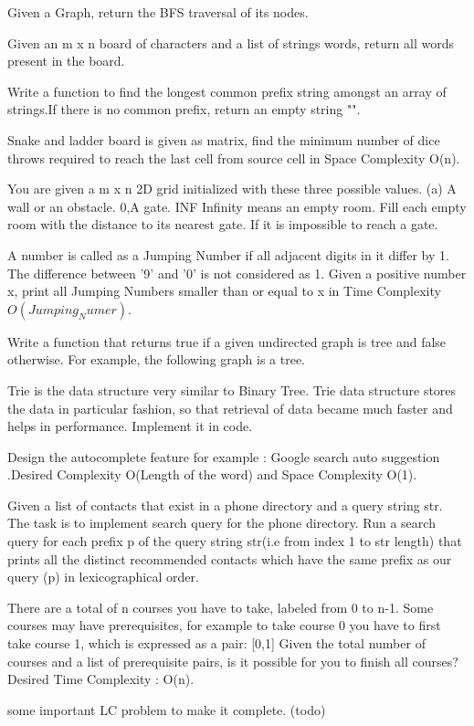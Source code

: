 {\begin{exercise}
\begin{compactenum}
    \item Given a Graph, return the BFS  traversal of its nodes.
    \item Given an m x n board of characters and a list of strings words, return all words present in the board.
    \item Write a function to find the longest common prefix string amongst an array of strings.If there is no common prefix, return an empty string "".
    \item Snake and ladder board is given as matrix, find the minimum number of dice throws required to reach the last cell from source cell in Space Complexity O(n).
    \item You are given a m x n 2D grid initialized with these three possible values.
    (a) A wall or an obstacle. 0,A gate. INF  Infinity means an empty room. Fill each empty room with the distance to its nearest gate. If it is impossible to reach a gate.
    \item A number is called as a Jumping Number if all adjacent digits in it differ by 1. The difference between '9' and '0' is not considered as 1. Given a positive number x, print all Jumping Numbers smaller than or equal to x in Time Complexity $O(Jumping_Numer)$.
    \item Write a function that returns true if a given undirected graph is tree and false otherwise. For example, the following graph is a tree.
    \item Trie is the data structure very similar to Binary Tree. Trie data structure stores the data in particular fashion, so that retrieval of data became much faster and helps in performance. Implement it in code.
    \item Design the autocomplete feature for example : Google search auto suggestion .Desired Complexity O(Length of the word) and Space Complexity O(1).
    \item Given a list of contacts that exist in a phone directory and a query string str. The task is to implement search query for the phone directory. Run a search query for each prefix p of the query string str(i.e from  index 1 to str length) that prints all the distinct recommended contacts which have the same prefix as our query (p) in lexicographical order.
    \item There are a total of n courses you have to take, labeled from 0 to n-1. Some courses may have prerequisites, for example to take course 0 you have to first take course 1, which is expressed as a pair: [0,1] Given the total number of courses and a list of prerequisite pairs, is it possible for you to finish all courses? Desired Time Complexity : O(n).
    \item some important LC problem to make it complete. (todo)
\end{compactenum}


\end{exercise}}

